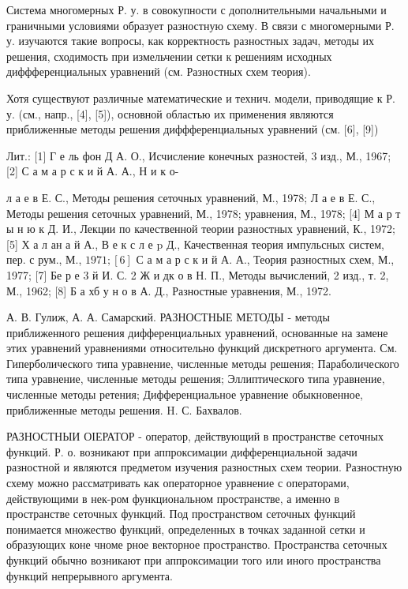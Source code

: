\documentclass[10pt]{article}
\begin{document}
Система многомерных Р. у. в совокупности с дополнительными начальными и граничными условиями образует разностную схему. В связи с многомерными Р. у. изучаются такие вопросы, как корректность разностных задач, методы их решения, сходимость при измельчении сетки к решениям исходных диффференциальных уравнений (см. Разностных схем теория).



Хотя существуют различные математические и технич. модели, приводящие к Р. у. (см., напр., [4], [5]), основной областью их применения являются приближенные методы решения диффференциальных уравнений (см. [6], [9])



Лит.: [1] Г е ль фон Д А. О., Исчисление конечных разностей, 3 изд., М., 1967; [2] С а м а р с к и й А. А., Н и к о-

л а е в Е. С., Методы решения сеточных уравнений, М., 1978; Л а е в Е. С., Методы решения сеточных уравнений, М., 1978; уравнения, М., 1978; [4] М а р т ы н ю к Д. И., Лекции по качественной теории разностных уравнений, К., 1972; [5] Х а л ан а й А., В е к с л е p Д., Качественная теория импульсных систем, пер. с рум., М., $1971 ;[6]$ С а м а р с к и й А. А., Теория разностных схем, М., 1977; [7] Бе р е 3 й И. С. 2 Ж и дк о в Н. П., Методы вычислений, 2 изд., т. 2, М., 1962; [8] Б а хб у н о в А. Д., Разностные уравнения, М., 1972.



А. В. Гулиж, А. А. Самарский. РАЗНОСТНЫЕ МЕТОДЫ - методы приближенного решения дифференциальных уравнений, основанные на замене этих уравнений уравнениями относительно функций дискретного аргумента. См. Гиперболического типа уравнение, численные методы решения; Параболического типа уравнение, численные методы решения; Эллиптического типа уравнение, численные методы ретения; Дифференциальное уравнение обыкновенное, приближенные методы решения. H. С. Бахвалов.



РАЗНОСТНЫИ ОІЕРАТОР - оператор, действующий в пространстве сеточных функций. Р. о. возникают при аппроксимации дифференциальной задачи разностной и являются предметом изучения разностных схем теории. Разностную схему можно рассматривать как операторное уравнение с операторами, действующими в нек-ром функциональном пространстве, а именно в пространстве сеточных функций. Под пространством сеточных функций понимается множество функций, определенных в точках заданной сетки и образующих коне чноме рное векторное пространство. Пространства сеточных функций обычно возникают при аппроксимации того или иного пространства функций непрерывного аргумента.
\end{document}
